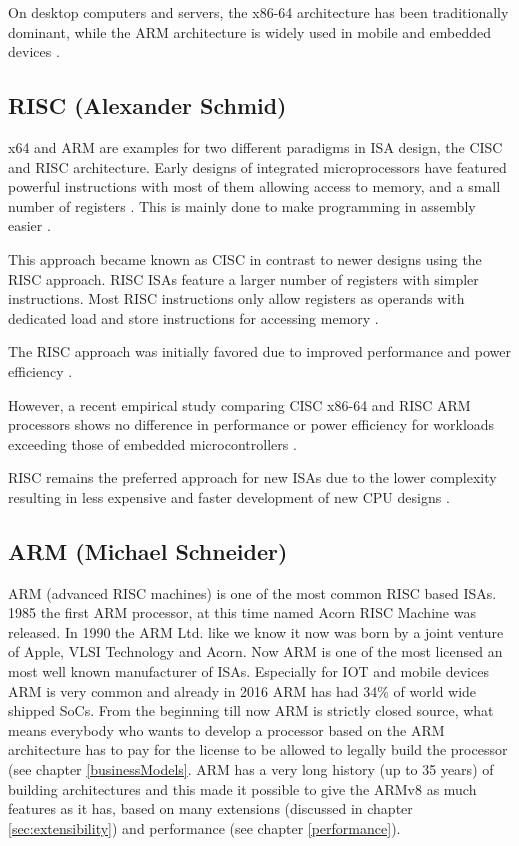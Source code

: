 \documentclass[conference]{IEEEtran}
\begin{document}
	On desktop computers and servers, the x86-64 architecture has been traditionally dominant,
	while the ARM architecture is widely used in mobile and embedded devices \cite{Blem2013}.

	\subsection{RISC (Alexander Schmid)}
	x64 and ARM are examples for two different paradigms in \gls{ISA} design, the \gls{CISC} and \gls{RISC} architecture.
	Early designs of integrated microprocessors have featured powerful instructions with most of them allowing access to memory,
	and a small number of registers \cite{George1990}. This is mainly done to make programming in assembly easier \cite[page 73]{Stokes2006}.

	This approach became known as \gls{CISC} in contrast to newer designs using the \gls{RISC} approach.
	\gls{RISC} \glspl{ISA} feature a larger number of registers with simpler instructions.
	Most \gls{RISC} instructions only allow registers as operands with dedicated load and store instructions for accessing memory \cite{George1990}.

	The \gls{RISC} approach was initially favored due to improved performance and power efficiency \cite{George1990}.
	
	However, a recent empirical study comparing \gls{CISC} x86-64 and \gls{RISC} ARM processors shows no difference in performance or power efficiency
	for workloads exceeding those of embedded microcontrollers \cite{Blem2013}.

	\gls{RISC} remains the preferred approach for new \glspl{ISA} due to the lower complexity resulting in less expensive and faster
	development of new CPU designs \cite{George1990}. 

	\subsection{ARM (Michael Schneider)}
	ARM (advanced RISC machines) is one of the most common \gls{RISC} based \glspl{ISA}. 1985 the first ARM processor, at this time named Acorn RISC Machine was released. In 1990 the ARM Ltd. like we know it now was born by a joint venture of Apple, VLSI Technology and Acorn. \cite{Levy2005}
	 Now ARM is one of the most licensed an most well known manufacturer of \glspl{ISA}. Especially for IOT and mobile devices ARM is very common and already in 2016 ARM has had 34\% of world wide shipped SoCs. \cite{Holdings2018}
	From the beginning till now ARM is strictly closed source, what means everybody who wants to develop a processor based on the ARM architecture has to pay for the license to be allowed to legally build the processor (see chapter \ref{businessModels}. ARM has a very long history (up to 35 years) of building architectures and this made it possible to give the ARMv8 as much features as it has, based on many extensions (discussed in chapter \ref{sec:extensibility}) and performance (see chapter \ref{performance}).
	
\end{document}
